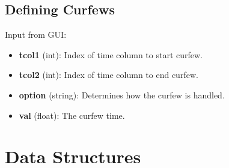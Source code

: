 \documentclass{article}
\begin{document}
\subsection*{Defining Curfews}
Input from GUI:

\begin{itemize}
	\item \textbf{tcol1} (int): Index of time column to start curfew.
	\item \textbf{tcol2} (int): Index of time column to end curfew.
	\item \textbf{option} (string): Determines how the curfew is handled.
	\item \textbf{val} (float): The curfew time.
\end{itemize}

\section{Data Structures}
\end{document}
